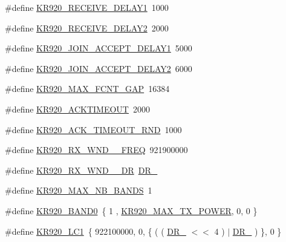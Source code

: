 \begin{DoxyCompactItemize}
\item 
\#define \hyperlink{group__REGIONKR920_ga904678fc97b70ac1fc102cf5712892b4}{K\+R920\+\_\+\+R\+E\+C\+E\+I\+V\+E\+\_\+\+D\+E\+L\+A\+Y1}~1000
\item 
\#define \hyperlink{group__REGIONKR920_gab54449881d40cbb65cf84a0cebf83295}{K\+R920\+\_\+\+R\+E\+C\+E\+I\+V\+E\+\_\+\+D\+E\+L\+A\+Y2}~2000
\item 
\#define \hyperlink{group__REGIONKR920_ga732f8186b63eb943e2acbbc61eaf9725}{K\+R920\+\_\+\+J\+O\+I\+N\+\_\+\+A\+C\+C\+E\+P\+T\+\_\+\+D\+E\+L\+A\+Y1}~5000
\item 
\#define \hyperlink{group__REGIONKR920_ga2f6e9182d6583e30c0436688ae3c680a}{K\+R920\+\_\+\+J\+O\+I\+N\+\_\+\+A\+C\+C\+E\+P\+T\+\_\+\+D\+E\+L\+A\+Y2}~6000
\item 
\#define \hyperlink{group__REGIONKR920_ga1b3db0e7a3e9d4126c6ffa3731a50a34}{K\+R920\+\_\+\+M\+A\+X\+\_\+\+F\+C\+N\+T\+\_\+\+G\+AP}~16384
\item 
\#define \hyperlink{group__REGIONKR920_ga274fcbad0638c07b7ee17dabaa76ea43}{K\+R920\+\_\+\+A\+C\+K\+T\+I\+M\+E\+O\+UT}~2000
\item 
\#define \hyperlink{group__REGIONKR920_ga26ae76d76a56899ec2fd39c9c77b601b}{K\+R920\+\_\+\+A\+C\+K\+\_\+\+T\+I\+M\+E\+O\+U\+T\+\_\+\+R\+ND}~1000
\item 
\#define \hyperlink{group__REGIONKR920_gac307ea5cebec6aef82e45e278f057bd2}{K\+R920\+\_\+\+R\+X\+\_\+\+W\+N\+D\+\_\+\_\+\+F\+R\+EQ}~921900000
\item 
\#define \hyperlink{group__REGIONKR920_gaf3d1c630f1608c0a38f5ecc6dadb6abb}{K\+R920\+\_\+\+R\+X\+\_\+\+W\+N\+D\+\_\+\_\+\+DR}~\hyperlink{group__REGION_ga6c4ef966b4f3d5eb7597b087f2b97095}{D\+R\+\_}
\item 
\#define \hyperlink{group__REGIONKR920_ga583dc0020ee40c41d888685baadfea12}{K\+R920\+\_\+\+M\+A\+X\+\_\+\+N\+B\+\_\+\+B\+A\+N\+DS}~1
\item 
\#define \hyperlink{group__REGIONKR920_ga1bb003b2b2b3a0b0fae035b8e0aa58e5}{K\+R920\+\_\+\+B\+A\+N\+D0}~\{ 1 , \hyperlink{group__REGIONKR920_ga83f7aad24311983622b179a74c3c80d0}{K\+R920\+\_\+\+M\+A\+X\+\_\+\+T\+X\+\_\+\+P\+O\+W\+ER}, 0,  0 \}
\item 
\#define \hyperlink{group__REGIONKR920_gac390f2ca3193094872899d5062f6e9c9}{K\+R920\+\_\+\+L\+C1}~\{ 922100000, 0, \{ ( ( \hyperlink{group__REGION_ga872e12c82020c02a7f70a1c6ed1375df}{D\+R\+\_} $<$$<$ 4 ) $\vert$ \hyperlink{group__REGION_ga6c4ef966b4f3d5eb7597b087f2b97095}{D\+R\+\_} ) \}, 0 \}
\item 
$$
\end{DoxyCompactItemize}
